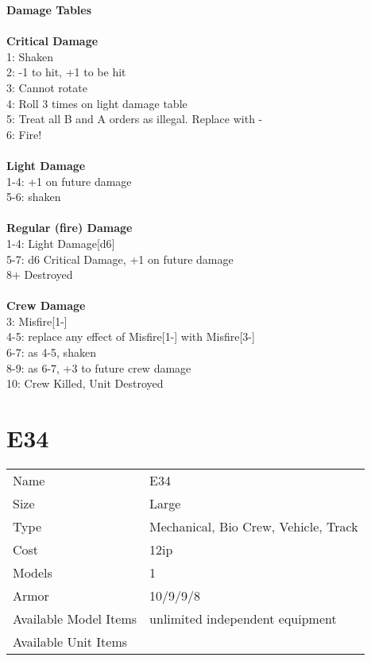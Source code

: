 {\bf Damage Tables} \\
\ \\ {\bf Critical Damage } \\
1: Shaken \\
2: -1 to hit, +1 to be hit \\
3: Cannot rotate \\
4: Roll 3 times on light damage table \\
5: Treat all B and A orders as illegal. Replace with - \\
6: Fire! \\
\ \\ {\bf Light Damage } \\
1-4: +1 on future damage \\
5-6: shaken \\
\ \\ {\bf Regular (fire) Damage } \\
1-4: Light Damage[d6] \\
5-7: d6 Critical Damage, +1 on future damage \\
8+ Destroyed \\
\ \\ {\bf Crew Damage } \\
3: Misfire[1-] \\
4-5: replace any effect of Misfire[1-] with Misfire[3-] \\
6-7: as 4-5, shaken \\
8-9: as 6-7, +3 to future crew damage \\
10: Crew Killed, Unit Destroyed \\









\pagebreak

\section{ E34 }

\begin{tabular}{ll}
  Name & E34 \\
  Size & Large\\
  Type & Mechanical, Bio Crew, Vehicle, Track\\
  Cost & 12ip\\
  Models & 1\\
  Armor & 10/9/9/8\\
  Available Model Items & unlimited independent equipment \\
  Available Unit Items &  \\
\end{tabular}

